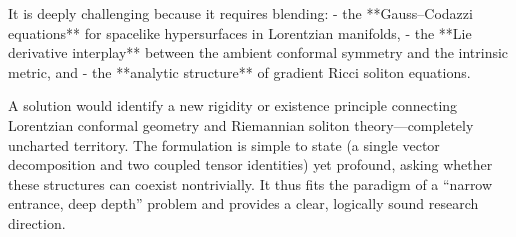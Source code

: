 It is deeply challenging because it requires blending:
- the **Gauss–Codazzi equations** for spacelike hypersurfaces in Lorentzian manifolds,  
- the **Lie derivative interplay** between the ambient conformal symmetry and the intrinsic metric, and  
- the **analytic structure** of gradient Ricci soliton equations.  

A solution would identify a new rigidity or existence principle connecting Lorentzian conformal geometry and Riemannian soliton theory—completely uncharted territory.  
The formulation is simple to state (a single vector decomposition and two coupled tensor identities) yet profound, asking whether these structures can coexist nontrivially. It thus fits the paradigm of a “narrow entrance, deep depth” problem and provides a clear, logically sound research direction.